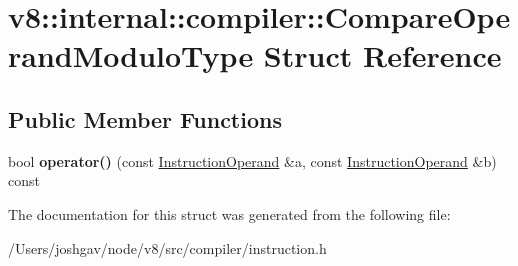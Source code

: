 \hypertarget{structv8_1_1internal_1_1compiler_1_1_compare_operand_modulo_type}{}\section{v8\+:\+:internal\+:\+:compiler\+:\+:Compare\+Operand\+Modulo\+Type Struct Reference}
\label{structv8_1_1internal_1_1compiler_1_1_compare_operand_modulo_type}
\subsection*{Public Member Functions}
\begin{DoxyCompactItemize}
\item 
bool {\bfseries operator()} (const \hyperlink{classv8_1_1internal_1_1compiler_1_1_instruction_operand}{Instruction\+Operand} \&a, const \hyperlink{classv8_1_1internal_1_1compiler_1_1_instruction_operand}{Instruction\+Operand} \&b) const \hypertarget{structv8_1_1internal_1_1compiler_1_1_compare_operand_modulo_type_ab3549777ad9cf5b6fd40a4fa82c860d1}{}\label{structv8_1_1internal_1_1compiler_1_1_compare_operand_modulo_type_ab3549777ad9cf5b6fd40a4fa82c860d1}

\end{DoxyCompactItemize}


The documentation for this struct was generated from the following file\+:\begin{DoxyCompactItemize}
\item 
/\+Users/joshgav/node/v8/src/compiler/instruction.\+h\end{DoxyCompactItemize}
